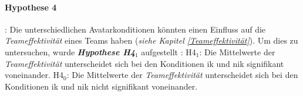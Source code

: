 \documentclass[a4paper,11pt]{article}%
\renewcommand{\\}{\vspace*{0.5\baselineskip} \newline}
\begin{document}
\paragraph{Hypothese 4}:
Die unterschiedlichen Avatarkonditionen könnten einen Einfluss auf die \textit{Teameffektivität} eines Teams haben (\textit{siehe Kapitel \ref{Teameffektivität}}). Um dies zu untersuchen, wurde \textbf{\textit{Hypothese H4$_{1}$}} aufgestellt :\\
H4$_{1}$: Die Mittelwerte der \textit{Teameffektivität} unterscheidet sich bei den Konditionen \ac{ik} und \ac{nik} signifikant voneinander. \newline
H4$_{0}$: Die Mittelwerte der \textit{Teameffektivität} unterscheidet sich bei den Konditionen \ac{ik} und \ac{nik} nicht signifikant voneinander. \\
%	
\end{document}
